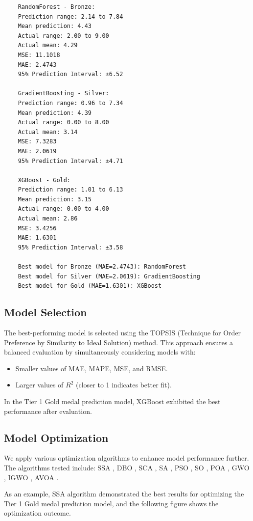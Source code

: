 \documentclass{mcmthesis}
\begin{document}
\begin{lstlisting}
    RandomForest - Bronze:
    Prediction range: 2.14 to 7.84
    Mean prediction: 4.43
    Actual range: 2.00 to 9.00
    Actual mean: 4.29
    MSE: 11.1018
    MAE: 2.4743
    95% Prediction Interval: ±6.52
    
    GradientBoosting - Silver:
    Prediction range: 0.96 to 7.34
    Mean prediction: 4.39
    Actual range: 0.00 to 8.00
    Actual mean: 3.14
    MSE: 7.3283
    MAE: 2.0619
    95% Prediction Interval: ±4.71
    
    XGBoost - Gold:
    Prediction range: 1.01 to 6.13
    Mean prediction: 3.15
    Actual range: 0.00 to 4.00
    Actual mean: 2.86
    MSE: 3.4256
    MAE: 1.6301
    95% Prediction Interval: ±3.58
    
    Best model for Bronze (MAE=2.4743): RandomForest
    Best model for Silver (MAE=2.0619): GradientBoosting
    Best model for Gold (MAE=1.6301): XGBoost
\end{lstlisting}
    

\subsection{Model Selection}

The best-performing model is selected using the TOPSIS (Technique for Order Preference by Similarity to Ideal Solution) method. This approach ensures a balanced evaluation by simultaneously considering models with:
\begin{itemize}
    \item Smaller values of MAE, MAPE, MSE, and RMSE.
    \item Larger values of $R^2$ (closer to 1 indicates better fit).
\end{itemize}
In the Tier 1 Gold medal prediction model, XGBoost exhibited the best performance after evaluation.

\subsection{Model Optimization}

We apply various optimization algorithms to enhance model performance further. The algorithms tested include:
SSA \cite{8}, DBO \cite{9}, SCA \cite{10}, SA \cite{11}, PSO \cite{12}, SO \cite{13}, POA \cite{14},  
GWO \cite{15}, IGWO \cite{16}, AVOA \cite{17}.

As an example, SSA algorithm demonstrated the best results for optimizing the Tier 1 Gold medal prediction model, and the following figure shows the optimization outcome.
\end{document}

